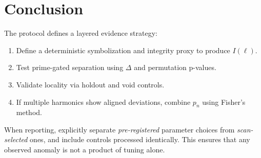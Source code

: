 \documentclass[11pt,a4paper]{article}
\begin{document}
\section{Conclusion}
The protocol defines a layered evidence strategy:
\begin{enumerate}
\item Define a deterministic symbolization and integrity proxy to produce $I(\ell)$.
\item Test prime-gated separation using $\Delta$ and permutation p-values.
\item Validate locality via holdout and void controls.
\item If multiple harmonics show aligned deviations, combine $p_n$ using Fisher's method.
\end{enumerate}
When reporting, explicitly separate \emph{pre-registered} parameter choices
from \emph{scan-selected} ones, and include controls processed identically.
This ensures that any observed anomaly is not a product of tuning alone.
\end{document}

